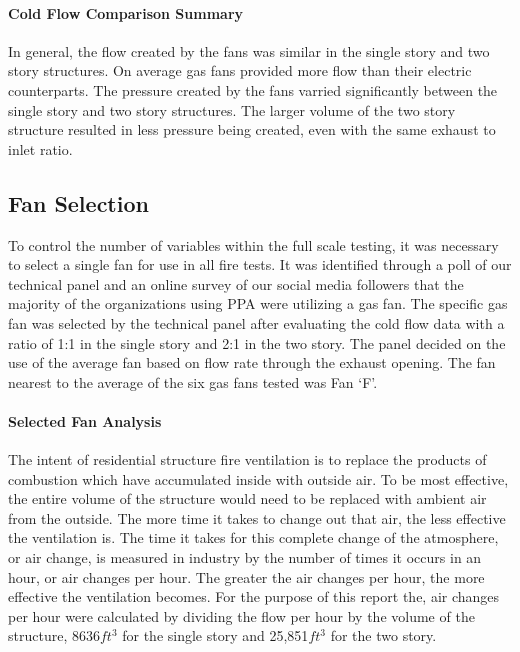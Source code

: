 \documentclass{article}
\begin{document}
\paragraph{Cold Flow Comparison Summary} \mbox{}

In general, the flow created by the fans was similar in the single story and two story structures. On average gas fans provided more flow than their electric counterparts. The pressure created by the fans varried significantly between the single story and two story structures. The larger volume of the two story structure resulted in less pressure being created, even with the same exhaust to inlet ratio. 

\subsection{Fan Selection}

To control the number of variables within the full scale testing, it was necessary to select a single fan for use in all fire tests. It was identified through a poll of our technical panel and an online survey of our social media followers that the majority of the organizations using PPA were utilizing a gas fan. The specific gas fan was selected by the technical panel after evaluating the cold flow data with a ratio of 1:1 in the single story and 2:1 in the two story. The panel decided on the use of the average fan based on flow rate through the exhaust opening. The fan nearest to the average of the six gas fans tested was Fan `F'. 

\paragraph{Selected Fan Analysis} \mbox{}

The intent of residential structure fire ventilation is to replace the products of combustion which have accumulated inside with outside air. To be most effective, the entire volume of the structure would need to be replaced with ambient air from the outside. The more time it takes to change out that air, the less effective the ventilation is. The time it takes for this complete change of the atmosphere, or air change, is measured in industry by the number of times it occurs in an hour, or air changes per hour. The greater the air changes per hour, the more effective the ventilation becomes. For the purpose of this report the, air changes per hour were calculated by dividing the flow per hour by the volume of the structure,  8636$ft^3$ for the single story and 25,851$ft^3$ for the two story. 
\end{document}

